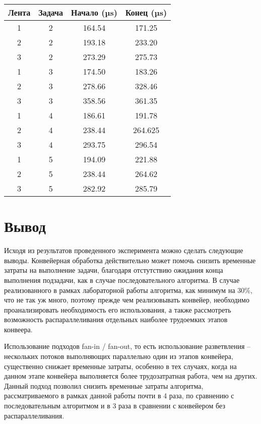 \begin{table}[!ht]
	\begin{center}
		\begin{tabular}{|c|c|c|c|} 
			\hline
			Лента & Задача & Начало (µs) & Конец (µs) \\  
			\hline
			1 & 2 & 164.54 & 171.25 \\
			\hline
			2 & 2 & 193.18 & 233.20 \\
			\hline
			3 & 2 & 273.29 & 275.73 \\
			\hline
			1 & 3 & 174.50 & 183.26 \\
			\hline
			2 & 3 & 278.66 & 328.46 \\
			\hline
			3 & 3 & 358.56 & 361.35 \\
			\hline
			1 & 4 & 186.61 & 191.78 \\
			\hline
			2 & 4 & 238.44 & 264.625 \\
			\hline
			3 & 4 & 293.75 & 296.54 \\
			\hline
			1 & 5 & 194.09 & 221.88 \\
			\hline
			2 & 5 & 238.44 & 264.62 \\
			\hline
			3 & 5 & 282.92 & 285.79 \\
			\hline
		\end{tabular}
		\label{tab:profiling-trace}
	\end{center}
\end{table}


\section{Вывод}

Исходя из результатов проведенного эксперимента можно сделать следующие выводы.
Конвейерная обработка действительно может помочь снизить 
временные затраты на выполнение задачи, благодаря отстутствию ожидания
конца выполнения подзадачи, как в случае последовательного алгоритма. В
случае реализованного в рамках лабораторной работы алгоритма, как минимум на 30\%, что
не так уж много, поэтому прежде чем реализовывать конвейер, необходимо проанализировать
необходимость его использования, а также рассмотреть возможность распараллеливания отдельных
наиболее трудоемких этапов конвеера.

Использование подходов fan-in / fan-out, то есть использование разветвления --
нескольких потоков выполняющих параллельно один из этапов конвейера, существенно
снижает временные затраты, особенно в тех случаях, когда на данном этапе конвейера
выполняется более трудозатратная работа, чем на других. Данный подход позволил снизить временные
затраты алгоритма, рассматриваемого в рамках данной работы почти в 4 раза, по сравнению с последовательным
алгоритмом и в 3 раза в сравнении с конвейером без распараллеливания.
